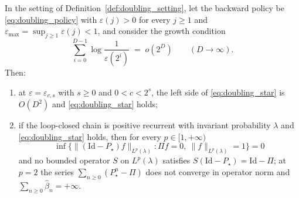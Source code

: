 \begin{theorem}\label{theo:doubling_unbounded}
In the setting of Definition~\ref{def:doubling_setting}, let the backward policy be
\eqref{eq:doubling_policy} with $\varepsilon(j)>0$ for every $j\geq1$ and
$\varepsilon_{\max}=\sup_{j\geq1}\varepsilon(j)<1$, and consider the growth condition
\begin{equation}\label{eq:doubling_star}
    \sum_{i=0}^{D-1}\log\frac{1}{\varepsilon(2^i)}\;=\;o\left(2^D\right)\qquad(D\rightarrow\infty).
\end{equation}
Then:
\begin{enumerate}
    \item at $\varepsilon=\varepsilon_{c,s}$ with $s\geq0$ and $0<c<2^s$, the left side of
    \eqref{eq:doubling_star} is $O\left(D^2\right)$ and \eqref{eq:doubling_star} holds;
    \item if the loop-closed chain is positive recurrent with invariant probability $\lambda$
    and \eqref{eq:doubling_star} holds, then for every $p\in[1,+\infty)$
    \begin{equation}\label{eq:doubling_inf}
        \inf\bigl\{\|(\mathrm{Id}-P_\star)f\|_{L^p(\lambda)}:\Pi f=0,\
        \|f\|_{L^p(\lambda)}=1\bigr\}=0
    \end{equation}
    and no bounded operator $S$ on $L^p(\lambda)$ satisfies
    $S(\mathrm{Id}-P_\star)=\mathrm{Id}-\Pi$; at $p=2$ the series
    $\sum_{n\geq0}(P_\star^n-\Pi)$ does not converge in operator norm and
    $\sum_{n\geq0}\widehat\beta_n=+\infty$.
\end{enumerate}
\end{theorem}

